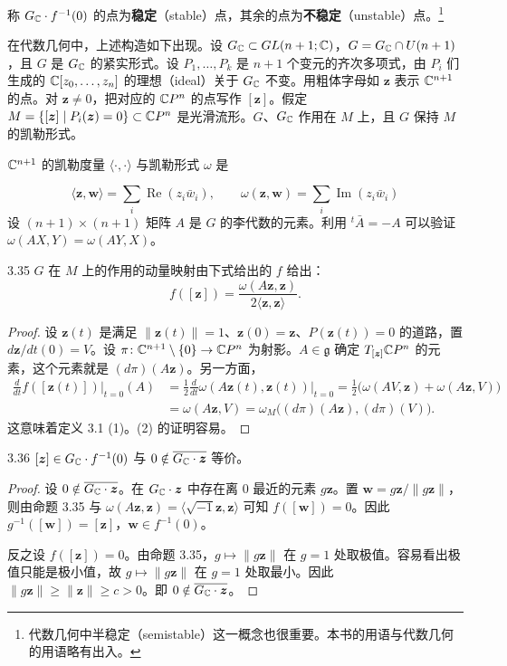 称 $G_{\mathbb{C}}\cdot f^{-1}(0)$ 的点为\textbf{稳定}（stable）点，其余的点为\textbf{不稳定}（unstable）点。\footnote{代数几何中半稳定（semistable）这一概念也很重要。本书的用语与代数几何的用语略有出入。}

在代数几何中，上述构造如下出现。设 $G_{\mathbb{C}}\subset GL(n+1;\mathbb{C})$，$G=G_{\mathbb{C}}\cap U(n+1)$，且 $G$ 是 $G_{\mathbb{C}}$ 的紧实形式。设 $P_1,\dots,P_k$ 是 $n+1$ 个变元的齐次多项式，由 $P_i$ 们生成的 $\mathbb{C}[z_0,\dots,z_n]$ 的理想（ideal）关于 $G_{\mathbb{C}}$ 不变。用粗体字母如 $\bm z$ 表示 $\mathbb{C}^{n+1}$ 的点。对 $\bm z\neq0$，把对应的 $\mathbb{C}P^n$ 的点写作 $[\bm z]$。假定 $M=\{[\bm z]\mid P_i(\bm z)=0\}\subset\mathbb{C}P^n$ 是光滑流形。$G$、$G_{\mathbb{C}}$ 作用在 $M$ 上，且 $G$ 保持 $M$ 的凯勒形式。

$\mathbb{C}^{n+1}$ 的凯勒度量 $\langle\cdot,\cdot\rangle$ 与凯勒形式 $\omega$ 是

\[
  \langle\bm z,\bm w\rangle=\sum_i\operatorname{Re}(z_i\bar w_i),\qquad
  \omega(\bm z,\bm w)=\sum_i\operatorname{Im}(z_i\bar w_i)
\]
设 $(n+1)\times(n+1)$ 矩阵 $A$ 是 $G$ 的李代数的元素。利用 ${}^t\bar A=-A$ 可以验证 $\omega(AX,Y)=\omega(AY,X)$。

\begin{proposition*}{3.35}
  $G$ 在 $M$ 上的作用的动量映射由下式给出的 $f$ 给出：
  \[
    f([\bm z])=\frac{\omega(A\bm z,\bm z)}{2\langle\bm z,\bm z\rangle}.
  \]
\end{proposition*}

\begin{proof}
  设 $\bm z(t)$ 是满足 $\|\bm z(t)\|=1$、$\bm z(0)=\bm z$、$P(\bm z(t))=0$ 的道路，置 $d\bm z/dt(0)=V$。设 $\pi\colon\mathbb{C}^{n+1}\setminus\{0\}\to\mathbb{C}P^n$ 为射影。$A\in\mathfrak{g}$ 确定 $T_{[\bm z]}\mathbb{C}P^n$ 的元素，这个元素就是 $(d\pi)(A\bm z)$。另一方面，
  \begin{align*}
    \frac{d}{dt}f([\bm z(t)])\Big|_{t=0}(A)
    &=\frac{1}{2}\frac{d}{dt}\omega(A\bm z(t),\bm z(t))\Big|_{t=0}
     =\frac{1}{2}\bigl(\omega(AV,\bm z)+\omega(A\bm z,V)\bigr)\\
    &=\omega(A\bm z,V)=\omega_M\bigl((d\pi)(A\bm z),(d\pi)(V)\bigr).
  \end{align*}
  这意味着定义 3.1 (1)。(2) 的证明容易。
\end{proof}

\begin{proposition*}{3.36}
  $[\bm z]\in G_{\mathbb{C}}\cdot f^{-1}(0)$ 与 $0\notin\overline{G_{\mathbb{C}}\cdot\bm z}$ 等价。
\end{proposition*}

\begin{proof}
  设 $0\notin\overline{G_{\mathbb{C}}\cdot\bm z}$。在 $G_{\mathbb{C}}\cdot\bm z$ 中存在离 $0$ 最近的元素 $g\bm z$。置 $\bm w=g\bm z/\|g\bm z\|$，则由命题 3.35 与 $\omega(A\bm z,\bm z)=\langle\sqrt{-1}\bm z,\bm z\rangle$ 可知 $f([\bm w])=0$。因此 $g^{-1}([\bm w])=[\bm z]$，$\bm w\in f^{-1}(0)$。

  反之设 $f([\bm z])=0$。由命题 3.35，$g\mapsto\|g\bm z\|$ 在 $g=1$ 处取极值。容易看出极值只能是极小值，故 $g\mapsto\|g\bm z\|$ 在 $g=1$ 处取最小。因此 $\|g\bm z\|\ge\|\bm z\|\ge c>0$。即 $0\notin\overline{G_{\mathbb{C}}\cdot\bm z}$。
\end{proof}


